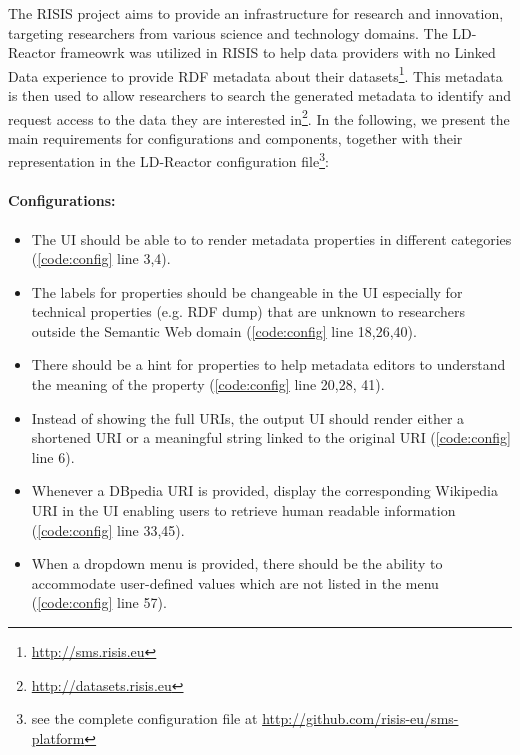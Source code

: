 \documentclass{acm_proc_article-sp}
\begin{document}
The RISIS project aims to provide an infrastructure for research and innovation, targeting researchers from various science and technology domains.
The LD-Reactor frameowrk was utilized in RISIS to help data providers with no Linked Data experience to provide RDF metadata about their datasets\footnote{\url{http://sms.risis.eu}}. This metadata is then used to allow researchers to search the generated metadata to identify and request access to the data they are interested in\footnote{\url{http://datasets.risis.eu}}.
In the following, we present the main requirements for configurations and components, together with their representation in the LD-Reactor configuration file\footnote{see the complete configuration file at \url{http://github.com/risis-eu/sms-platform}}:

\paragraph{Configurations:}
\begin{itemize}
 \item The UI should be able to to render metadata properties in different categories (\autoref{code:config} line 3,4).
 \item The labels for properties should be changeable in the UI especially for technical properties (e.g. RDF dump) that are unknown to researchers outside the Semantic Web domain (\autoref{code:config} line 18,26,40).
 \item There should be a hint for properties to help metadata editors to understand the meaning of the property (\autoref{code:config} line 20,28, 41).
 \item Instead of showing the full URIs, the output UI should render either a shortened URI or a meaningful string linked to the original URI (\autoref{code:config} line 6). 
 \item Whenever a DBpedia URI is provided, display the corresponding Wikipedia URI in the UI enabling users to retrieve human readable information (\autoref{code:config} line 33,45).
 \item When a dropdown menu is provided, there should be the ability to accommodate user-defined values which are not listed in the menu (\autoref{code:config} line 57).
 
\end{itemize}
\end{document}
